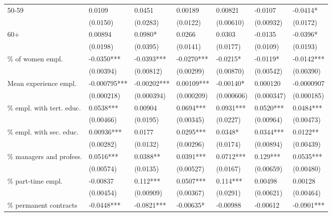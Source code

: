 {\begin{tabular}{lllllll}
50-59                            &  0.0109       & 0.0451      & 0.00189    & 0.00821    & -0.0107    & -0.0414*    \\
                                 &  (0.0150)     & (0.0283)    & (0.0122)   & (0.00610)  & (0.00932)  & (0.0172)    \\
60+                              &  0.00894      & 0.0980*     & 0.0266     & 0.0303     & -0.0135    & -0.0396*    \\
                                 &  (0.0198)     & (0.0395)    & (0.0141)   & (0.0177)   & (0.0109)   & (0.0193)    \\
\% of women empl.                &  -0.0350***   & -0.0393***  & -0.0270*** & -0.0215*   & -0.0119*   & -0.0142***  \\
                                 &  (0.00394)    & (0.00812)   & (0.00299)  & (0.00870)  & (0.00542)  & (0.00390)   \\
Mean experience empl.            &  -0.000795*** & -0.00202*** & 0.00109*** & -0.00140*  & 0.000120   & -0.0000907  \\
                                 &  (0.000218)   & (0.000394)  & (0.000209) & (0.000606) & (0.000347) & (0.000185)  \\
\% empl. with tert. educ.        &  0.0538***    & 0.00904     & 0.0694***  & 0.0931***  & 0.0520***  & 0.0484***   \\
                                 &  (0.00466)    & (0.0195)    & (0.00345)  & (0.0227)   & (0.00964)  & (0.00473)   \\
\% empl. with sec. educ.         &  0.00936***   & 0.0177      & 0.0295***  & 0.0348*    & 0.0344***  & 0.0122**    \\
                                 &  (0.00282)    & (0.0132)    & (0.00296)  & (0.0174)   & (0.00894)  & (0.00439)   \\
\% managers and profess.         &  0.0516***    & 0.0388**    & 0.0391***  & 0.0712***  & 0.129***   & 0.0535***   \\
                                 &  (0.00574)    & (0.0135)    & (0.00527)  & (0.0167)   & (0.00659)  & (0.00480)   \\
\% part-time empl.               &  -0.00837     & 0.112***    & 0.0507***  & 0.114***   & 0.00498    & 0.00128     \\
                                 &  (0.00454)    & (0.00909)   & (0.00367)  & (0.0291)   & (0.00621)  & (0.00464)   \\
\% permanent contracts           &  -0.0448***   & -0.0821***  & -0.00635*  & -0.00988   & -0.00612   & -0.0901***  \\

\end{tabular}}
